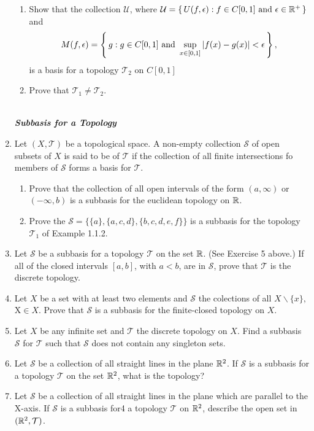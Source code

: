 \documentclass[10pt,a4paper]{report}
\newcommand{\SPECIAL}[1]{\begin{center}
	{\Large \textbf{\textit{\\#1}} }
\end{center}
}
\newcommand{\TT}{\mathcal{T}}
\newcommand{\UU}{\mathcal{U}}
\newcommand{\SB}{\mathcal{S}}
\begin{document}
\begin{enumerate}
\begin{enumerate}[label=(\roman*)]
	\item Show that the collection $\UU$, where $\UU=\BRACKET{U(f,\epsilon):f\in C[0,1]\AND \epsilon \in \R^+}$ and \[M(f,\epsilon) = \left \{\, g:g\in C[0,1]\text{ and } \sup_{x\in[0,1]} |f(x)-g(x)|< \epsilon \,\right \},\] is a basis for a topology $\TT_2$ on $C[0,1]$
	
	\item Prove that $\TT_1 \ne \TT_2$.

\end{enumerate}

\SPECIAL{Subbasis for a Topology}

\item Let $(X, \TT)$ be a topological space.  A non-empty collection $\SB$ of open subsets of $X$ is said to be  of $\TT$ if the collection of all finite intersections fo members of $\SB$ forms a basis for $\TT$.
\begin{enumerate}[label=(\roman*)]

	\item Prove that the collection of all open intervals of the form $(a, \infty)$ or $(-\infty, b)$ is a subbasis for the euclidean topology on $\mathbb{R}$.
	
	\item Prove the $\SB = \{\{a\}, \{a,c,d\},\{b,c,d,e,f\}\}$ is a subbasis for the topology $\TT_1$ of Example 1.1.2.

\end{enumerate}

\item Let $\SB$ be a subbasis for a topology $\TT$ on the set $\mathbb{R}$.  (See Exercise 5 above.)  If all of the closed intervals $[a,b]$, with $a<b$, are in $\SB$, prove that $\TT$ is the discrete topology.

\item Let $X$ be a set with at least two elements and $\SB$ the colections of all $X \backslash \{x\}, $X$ \in X$.  Prove that $\SB$ is a subbasis for the finite-closed topology on $X$.

\item Let $X$ be any infinite set and $\TT$ the discrete topology on $X$.  Find a subbasis $\SB$ for $\TT$ such that $\SB$ does not contain any singleton sets.

\item Let $\SB$ be a collection of all straight lines in the plane $\mathbb{R}^2$.  If $\SB$ is a subbasis for a topology $\TT$ on the set $\mathbb{R}^2$, what is the topology?

\item Let $\SB$ be a collection of all straight lines in the plane which are parallel to the X-axis.  If $\SB$ is a subbasis for4 a topology $\TT$ on $\mathbb{R}^2$, describe the open set in $(\R^2, \TT)$.


\end{enumerate}
\end{document}
